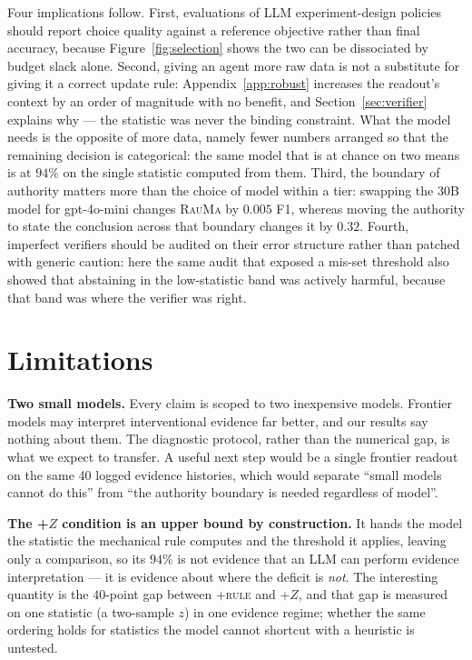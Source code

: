 \documentclass{article}
\newcommand{\rauma}{\textsc{RauMa}}
\begin{document}
Four implications follow. First, evaluations of LLM experiment-design policies should report
choice quality against a reference objective rather than final accuracy, because
Figure~\ref{fig:selection} shows the two can be dissociated by budget slack alone. Second,
giving an agent more raw data is not a substitute for giving it a correct update rule:
Appendix~\ref{app:robust} increases the readout's context by an order of magnitude with no
benefit, and Section~\ref{sec:verifier} explains why --- the statistic was never the binding
constraint. What the model needs is the opposite of more data, namely fewer numbers arranged
so that the remaining decision is categorical: the same model that is at chance on two means
is at $94\%$ on the single statistic computed from them. Third, the boundary of authority matters more than the choice of model within a
tier: swapping the 30B model for gpt-4o-mini changes \rauma{} by $0.005$ F1, whereas moving
the authority to state the conclusion across that boundary changes it by $0.32$. Fourth,
imperfect verifiers should be audited on their error structure rather than patched with
generic caution: here the same audit that exposed a mis-set threshold also showed that
abstaining in the low-statistic band was actively harmful, because that band was where the
verifier was right.

\section{Limitations}
\label{sec:limitations}

\textbf{Two small models.} Every claim is scoped to two inexpensive models. Frontier models
may interpret interventional evidence far better, and our results say nothing about them. The
diagnostic protocol, rather than the numerical gap, is what we expect to transfer. A useful
next step would be a single frontier readout on the same 40 logged evidence histories, which
would separate ``small models cannot do this'' from ``the authority boundary is needed
regardless of model''.

\textbf{The \textsc{+$Z$} condition is an upper bound by construction.} It hands the model the
statistic the mechanical rule computes and the threshold it applies, leaving only a comparison,
so its $94\%$ is not evidence that an LLM can perform evidence interpretation --- it is
evidence about where the deficit is \emph{not}. The interesting quantity is the $40$-point gap
between \textsc{+rule} and \textsc{+$Z$}, and that gap is measured on one statistic (a
two-sample $z$) in one evidence regime; whether the same ordering holds for statistics the
model cannot shortcut with a heuristic is untested.
\end{document}
